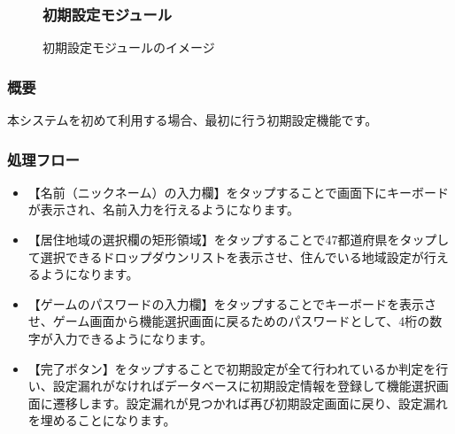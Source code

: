 \documentclass[a4j]{jarticle}
\begin{document}
\begin{figure}[H]
\subsubsection{初期設定モジュール\label{初期設定}}
    \begin{center}
    \caption {初期設定モジュールのイメージ}
    \label{initialsetting}
    \end{center}
\end{figure}


\subsubsection*{概要}
本システムを初めて利用する場合、最初に行う初期設定機能です。


\subsubsection*{処理フロー}
\begin{itemize}
\item 【名前（ニックネーム）の入力欄】をタップすることで画面下にキーボードが表示され、名前入力を行えるようになります。

\item 【居住地域の選択欄の矩形領域】をタップすることで47都道府県をタップして選択できるドロップダウンリストを表示させ、住んでいる地域設定が行えるようになります。

\item 【ゲームのパスワードの入力欄】をタップすることでキーボードを表示させ、ゲーム画面から機能選択画面に戻るためのパスワードとして、4桁の数字が入力できるようになります。

\item 【完了ボタン】をタップすることで初期設定が全て行われているか判定を行い、設定漏れがなければデータベースに初期設定情報を登録して機能選択画面に遷移します。設定漏れが見つかれば再び初期設定画面に戻り、設定漏れを埋めることになります。
\end{itemize}
\end{document}
